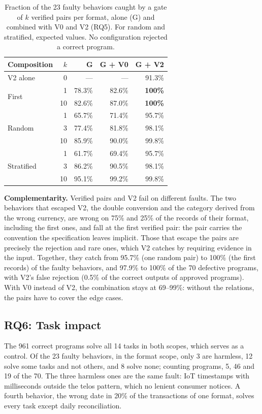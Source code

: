\documentclass[sigconf,nonacm]{acmart}
\begin{document}
\begin{table}[t]
\caption{Fraction of the 23 faulty behaviors caught by a gate of $k$ verified pairs per format, alone (G) and combined with V0 and V2 (RQ5). For random and stratified, expected values. No configuration rejected a correct program.}
\label{tab:rq5}
\small
\begin{tabular}{lrrrr}
\toprule
Composition & $k$ & G & G + V0 & G + V2 \\
\midrule
V2 alone & 0 & --- & --- & 91.3\% \\
\midrule
\multirow{2}{*}{First} & 1 & 78.3\% & 82.6\% & \textbf{100\%} \\
 & 10 & 82.6\% & 87.0\% & \textbf{100\%} \\
\midrule
\multirow{3}{*}{Random} & 1 & 65.7\% & 71.4\% & 95.7\% \\
 & 3 & 77.4\% & 81.8\% & 98.1\% \\
 & 10 & 85.9\% & 90.0\% & 99.8\% \\
\midrule
\multirow{3}{*}{Stratified} & 1 & 61.7\% & 69.4\% & 95.7\% \\
 & 3 & 86.2\% & 90.5\% & 98.1\% \\
 & 10 & 95.1\% & 99.2\% & 99.8\% \\
\bottomrule
\end{tabular}
\end{table}

\textbf{Complementarity.} Verified pairs and V2 fail on different faults. The two behaviors that escaped V2, the double conversion and the category derived from the wrong currency, are wrong on 75\% and 25\% of the records of their format, including the first ones, and fall at the first verified pair: the pair carries the convention the specification leaves implicit. Those that escape the pairs are precisely the rejection and rare ones, which V2 catches by requiring evidence in the input. Together, they catch from 95.7\% (one random pair) to 100\% (the first records) of the faulty behaviors, and 97.9\% to 100\% of the 70 defective programs, with V2's false rejection (0.5\% of the correct outputs of approved programs). With V0 instead of V2, the combination stays at 69--99\%: without the relations, the pairs have to cover the edge cases.

\subsection{RQ6: Task impact}
\label{sec:rq6}

The 961 correct programs solve all 14 tasks in both scopes, which serves as a control. Of the 23 faulty behaviors, in the format scope, only 3 are harmless, 12 solve some tasks and not others, and 8 solve none; counting programs, 5, 46 and 19 of the 70. The three harmless ones are the same fault: IoT timestamps with milliseconds outside the telos pattern, which no lenient consumer notices. A fourth behavior, the wrong date in 20\% of the transactions of one format, solves every task except daily reconciliation.
\end{document}
